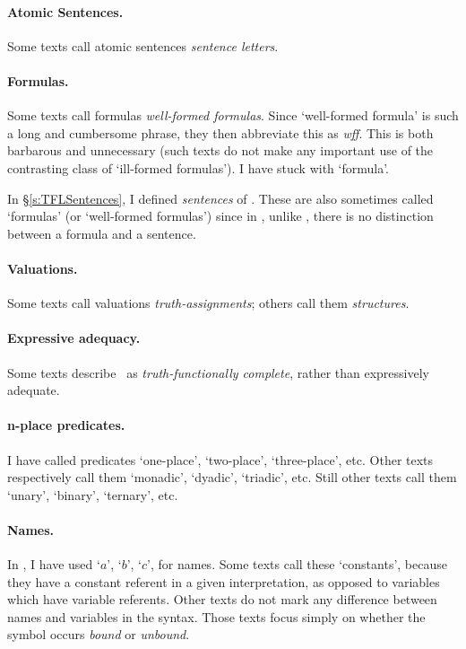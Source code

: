 \paragraph{Atomic Sentences.} Some texts call atomic sentences \emph{sentence letters}.

\paragraph{Formulas.} Some texts call formulas \emph{well-formed formulas}. Since `well-formed formula' is such a long and cumbersome phrase, they then abbreviate this as \emph{wff}. This is both barbarous and unnecessary (such texts do not make any important use of the contrasting class of `ill-formed formulas'). I have stuck with `formula'. 

In §\ref{s:TFLSentences}, I defined \emph{sentences} of \TFL. These are also sometimes called `formulas' (or `well-formed formulas') since in \TFL, unlike \FOL, there is no distinction between a formula and a sentence.

\paragraph{Valuations.} Some texts call valuations \emph{truth-assignments}; others call them \emph{structures}.

\paragraph{Expressive adequacy.} Some texts describe \TFL\ as \emph{truth-functionally complete}, rather than expressively adequate. 

\paragraph{n-place predicates.} I have called predicates `one-place', `two-place', `three-place', etc. Other texts respectively call them `monadic', `dyadic', `triadic', etc. Still other texts call them `unary', `binary', `ternary', etc.

\paragraph{Names.} In \FOL, I have used `$a$', `$b$', `$c$', for names. Some texts call these `constants', because they have a constant referent in a given interpretation, as opposed to variables which have variable referents. Other texts do not mark any difference between names and variables in the syntax. Those texts focus simply on  whether the symbol occurs \emph{bound} or \emph{unbound}. 

